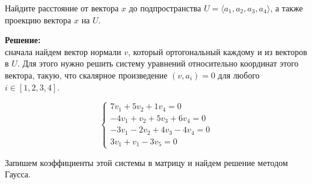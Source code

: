 \documentclass[a4paper,12pt]{article}
\begin{document}
\begin{enumerate}
Найдите расстояние от вектора $x$ до подпространства $U = \langle a_1,a_2,a_3, a_4 \rangle$, а также проекцию вектора $x$ на $U$.
\vspace{5pt}

\textbf{Решение:}\\
сначала найдем вектор нормали $v$, который ортогональный каждому и из векторов в $U$. Для этого нужно решить систему уравнений относительно координат этого вектора, такую, что скалярное произведение $(v,a_i)=0$ для любого $i \in [1,2,3,4]$.

$$\left\{
                \begin{array}{ll}
                  7v_1+5v_2+1v_4=0\\
                  -4v_1+v_2+5v_3+6v_4=0\\
                  -3v_1-2v_2+4v_3-4v_4 = 0\\
                  3v_1+v_1-3v_5=0
                \end{array}
              \right.$$
              
Запишем коэффициенты этой системы в матрицу и найдем решение методом Гаусса.


\end{enumerate}
\end{document}
